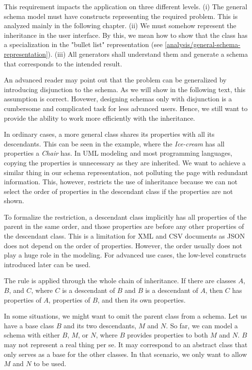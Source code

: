 This requirement impacts the application on three different levels. (i) The general schema model must have constructs representing the required problem. This is analyzed mainly in the following chapter. (ii) We must somehow represent the inheritance in the user interface. By this, we mean how to show that the class has a specialization in the "bullet list" representation (see \autoref{analysis/general-schema-representation}). (iii) All generators shall understand them and generate a schema that corresponds to the intended result.

\medskip

An advanced reader may point out that the problem can be generalized by introducing disjunction to the schema. As we will show in the following text, this assumption is correct. Hovewer, designing schemas only with disjunction is a cumbersome and complicated task for less advanced users. Hence, we still want to provide the ability to work more efficiently with the inheritance.

In ordinary cases, a more general class shares its properties with all its descendants. This can be seen in the example, where the \textit{Ice-cream} has all properties a \textit{Chair} has. In UML modeling and most programming languages, copying the properties is unnecessary as they are inherited. We want to achieve a similar thing in our schema representation, not polluting the page with redundant information. This, however, restricts the use of inheritance because we can not select the order of properties in the descendant class if the properties are not shown.

To formalize the restriction, a descendant class implicitly has all properties of the parent in the same order, and those properties are before any other properties of the descendant class. This is a limitation for XML and CSV documents as JSON does not depend on the order of properties. However, the order usually does not play a huge role in the modeling. For advanced use cases, the low-level constructs introduced later can be used.

The rule is applied through the whole chain of inheritance. If there are classes $A$, $B$, and $C$, where $C$ is a descendant of $B$ and $B$ is a descendant of $A$, then $C$ has properties of $A$, properties of $B$, and then its own properties.

In some situations, we might want to omit the parent class from a schema. Let us have a base class $B$ and its two descendants, $M$ and $N$. So far, we can model a schema with either $B$, $M$, or $N$, where $B$ provides properties to both $M$ and $N$. $B$ may not represent a real thing per se. It may correspond to an abstract class that only serves as a base for the other classes. In that scenario, we only want to allow $M$ and $N$ to be used.

